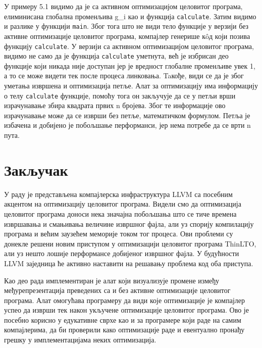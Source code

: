 \documentclass[12pt,oneside]{memoir}
\begin{document}
У примеру 5.1 видимо да је са активном оптимизацијом целовитог програма,
елиминисана глобална променљива g{\_}i  као и функција \texttt{calculate}.
Затим видимо и разлике у функцији \texttt{main}. 
Због тога што не види тело функције у верзији без активне оптимизације целовитог
програма, компајлер генерише к\^{o}д који позива функцију \texttt{calculate}.
У верзији са активном оптимизацијом целовитог програма, видимо не само да је функција
\texttt{calculate} уметнута, већ је избрисан део функције који никада није доступан
јер је вредност глобалне променљиве увек 1, а то се може видети тек после процеса
линковања.
Taкође, види се да је због уметања извршена и оптимизација петље.
Алат за
оптимизацију има информацију о телу \texttt{calculate} функције, помоћу тога он
закључује да се у петљи врши израчунавање збира квадрата првих n бројева.
Због те информације ово израчунавање може да се изврши без петље, математичком
формулом.
Петља је избачена и добијено је побољшање перформанси, јер нема потребе да се 
врти n пута.
\chapter{Закључак}
У раду је представљена компајлерска инфраструктура LLVM са посебним акцентом
на оптимизацију целовитог програма.
Видели смо да оптимизација целовитог програма доноси нека значајна побољшања
што се тиче времена извршавања и смањивања величине извршног фајла, али уз спорију
компилацију програма и већим заузећем меморије током тог процеса.
Ови проблеми су донекле решени новим приступом у оптимизацији целовитог програма
ThinLTO, али уз нешто лошије перформансе добијеног извршног фајла.
У будућности LLVM заједница ће активно наставити на решавању проблема код 
оба приступа.
\par
Као део рада имплементиран је алат који визуализује промене између
међурепрезентација преведених са и без активне оптимизације целовитог програма.
Алат омогућава програмеру да види које оптимизације је компајлер успео да изврши
тек након укључене оптимизације целовитог програма.
Ово је посебно корисно у едукативне сврхе као и за програмере који раде на самим
компајлерима, да би проверили како оптимизације раде и евентуално пронађу грешку
у имплементацијама неких оптимизација.



\backmatter
\end{document}
